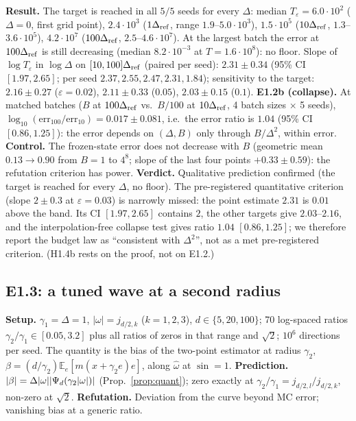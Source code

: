 \documentclass[11pt,a4paper]{article}
\numberwithin{equation}{section}
\theoremstyle{definition}
\theoremstyle{remark}
\newcommand{\E}{\mathbb E}\newcommand{\R}{\mathbb R}\newcommand{\N}{\mathbb N}\newcommand{\Prob}{\mathbb P}
\begin{document}
\textbf{Result.} The target is reached in all $5/5$ seeds for every $\Delta$: median $T_\varepsilon=6.0\cdot10^2$ ($\Delta=0$, first grid point), $2.4\cdot10^3$ ($1\Delta_{\rm ref}$, range $1.9$--$5.0\cdot10^3$), $1.5\cdot10^5$ ($10\Delta_{\rm ref}$, $1.3$--$3.6\cdot10^5$), $4.2\cdot10^7$ ($100\Delta_{\rm ref}$, $2.5$--$4.6\cdot10^7$). At the largest batch the error at $100\Delta_{\rm ref}$ is still decreasing (median $8.2\cdot10^{-3}$ at $T=1.6\cdot10^8$): no floor. Slope of $\log T_\varepsilon$ in $\log\Delta$ on $[10,100]\Delta_{\rm ref}$ (paired per seed): $2.31\pm0.34$ (95\% CI $[1.97,2.65]$; per seed $2.37,2.55,2.47,2.31,1.84$); sensitivity to the target: $2.16\pm0.27$ ($\varepsilon=0.02$), $2.11\pm0.33$ ($0.05$), $2.03\pm0.15$ ($0.1$).
\textbf{E1.2b (collapse).} At matched batches ($B$ at $100\Delta_{\rm ref}$ vs.\ $B/100$ at $10\Delta_{\rm ref}$, 4 batch sizes $\times$ 5 seeds), $\log_{10}(\mathrm{err}_{100}/\mathrm{err}_{10})=0.017\pm0.081$, i.e.\ the error ratio is $1.04$ (95\% CI $[0.86,1.25]$): the error depends on $(\Delta,B)$ only through $B/\Delta^2$, within error.
\textbf{Control.} The frozen-state error does not decrease with $B$ (geometric mean $0.13\to0.90$ from $B=1$ to $4^8$; slope of the last four points $+0.33\pm0.59$): the refutation criterion has power.
\textbf{Verdict.} Qualitative prediction confirmed (the target is reached for every $\Delta$, no floor). The pre-registered quantitative criterion (slope $2\pm0.3$ at $\varepsilon=0.03$) is narrowly missed: the point estimate $2.31$ is $0.01$ above the band. Its CI $[1.97,2.65]$ contains $2$, the other targets give $2.03$--$2.16$, and the interpolation-free collapse test gives ratio $1.04$ $[0.86,1.25]$; we therefore report the budget law as ``consistent with $\Delta^2$'', not as a met pre-registered criterion. (H1.4b rests on the proof, not on E1.2.)

\subsection{E1.3: a tuned wave at a second radius}
\textbf{Setup.} $\gamma_1=\Delta=1$, $|\omega|=j_{d/2,k}$ ($k=1,2,3$), $d\in\{5,20,100\}$; 70 log-spaced ratios $\gamma_2/\gamma_1\in[0.05,3.2]$ plus all ratios of zeros in that range and $\sqrt2$; $10^6$ directions per seed. The quantity is the bias of the two-point estimator at radius $\gamma_2$, $\beta=(d/\gamma_2)\E_e[m(x+\gamma_2e)e]$, along $\hat\omega$ at $\sin=1$.
\textbf{Prediction.} $\lvert \beta\rvert=\Delta|\omega|\lvert \Psi_d(\gamma_2|\omega|)\rvert$ (Prop.~\ref{prop:quant}); zero exactly at $\gamma_2/\gamma_1=j_{d/2,l}/j_{d/2,k}$, non-zero at $\sqrt2$.
\textbf{Refutation.} Deviation from the curve beyond MC error; vanishing bias at a generic ratio.
\end{document}
